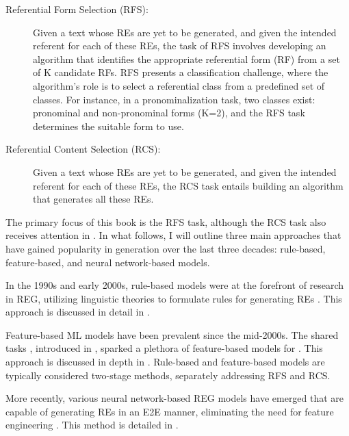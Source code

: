 \begin{description}
\item[Referential Form Selection (RFS):] Given a text whose REs are yet to be generated, and given the intended referent for each of these REs, the task of RFS involves developing an algorithm that identifies the appropriate referential form (RF) from a set of K candidate RFs. RFS presents a classification challenge, where the algorithm's role is to select a referential class from a predefined set of classes. For instance, in a pronominalization task, two classes exist: pronominal and non-pronominal forms (K=2), and the RFS task determines the suitable form to use.

\item[Referential Content Selection (RCS):] Given a text whose REs are yet to be generated, and given the intended referent for each of these REs, the RCS task entails building an algorithm that generates all these REs.
\end{description}

The primary focus of this book is the RFS task, although the RCS task also receives attention in . In what follows, I will outline three main approaches that have gained popularity in \context generation over the last three decades: rule-based, feature-based, and neural network-based models. 

In the 1990s and early 2000s, rule-based models were at the forefront of research in REG, utilizing linguistic theories to formulate rules for generating REs \citep{dale1989cooking,passonneau1996using, mccoy1999generating, henschel2000pronominalization}. This approach is discussed in detail in .

Feature-based ML models have been prevalent since the mid-2000s. The \grec shared tasks \citep{belz2010generating}, introduced in , sparked a plethora of feature-based models for \context \citep{hendrickx2008cnts,bohnet2008g,greenbacker2009udel}. 
This approach is discussed in depth in .  Rule-based and feature-based models are typically considered two-stage methods, separately addressing RFS and RCS.

More recently, various neural network-based REG models have emerged that are capable of generating REs in an E2E manner, eliminating the need for feature engineering \citep{ferreira2018neuralreg, cao2019referring, cunha-etal-2020-referring}. This method is detailed in .



